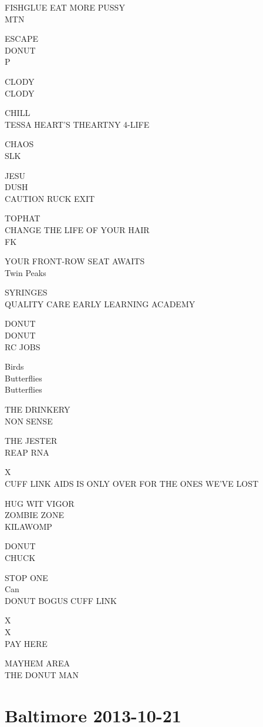 \documentclass[10pt,letterpaper]{article}
\begin{document}
FISHGLUE EAT MORE PUSSY\\
MTN

ESCAPE\\
DONUT\\
P

CLODY\\
CLODY

CHILL\\
TESSA HEART'S THEARTNY 4{-}LIFE

CHAOS\\
SLK

JESU\\
DUSH\\
CAUTION RUCK EXIT

TOPHAT\\
CHANGE THE LIFE OF YOUR HAIR\\
FK

YOUR FRONT{-}ROW SEAT AWAITS\\
Twin Peaks

SYRINGES\\
QUALITY CARE EARLY LEARNING ACADEMY

DONUT\\
DONUT\\
RC JOBS

Birds\\
Butterflies\\
Butterflies

THE DRINKERY\\
NON SENSE

THE JESTER\\
REAP RNA

X\\
CUFF LINK AIDS IS ONLY OVER FOR THE ONES WE'VE LOST

HUG WIT VIGOR\\
ZOMBIE ZONE\\
KILAWOMP

DONUT\\
CHUCK

STOP ONE\\
Can\\
DONUT BOGUS CUFF LINK

X\\
X\\
PAY HERE

MAYHEM AREA\\
THE DONUT MAN


\section*{Baltimore 2013-10-21}
\end{document}
